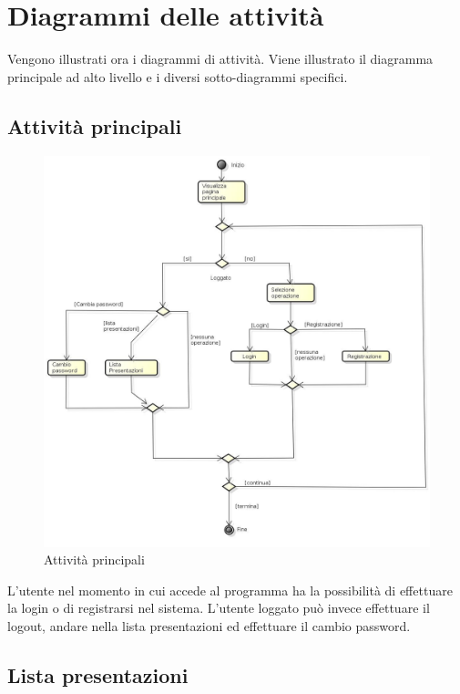 \newpage
\section{Diagrammi delle attività}
Vengono illustrati ora i diagrammi di attività. Viene illustrato il diagramma principale ad alto livello e i diversi sotto-diagrammi specifici.

\subsection{Attività principali}

\begin{figure}[h!]
		\centering
		\includegraphics[scale=.4]{img/attivita/Premi.jpg}
		\caption{Attività principali}
		\label{fig:Attivita_principali}
\end{figure}

L'utente nel momento in cui accede al programma ha la possibilità di effettuare la login o di registrarsi nel sistema. 
L'utente loggato può invece effettuare il logout, andare nella lista presentazioni ed effettuare il cambio password.

\subsection{Lista presentazioni}

